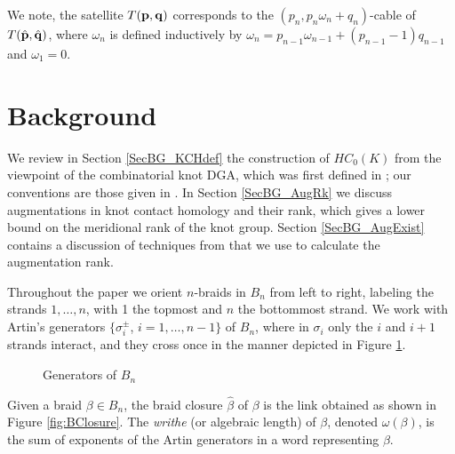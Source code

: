 \documentclass[11pt]{amsart}
\def\s{{\sigma}}
\theoremstyle{definition}
\begin{document}
We note, the satellite $T({\bf p},{\bf q})$ corresponds to the $(p_n,p_n\omega_n+q_n)$-cable of $T(\hat{\bf p},\hat{\bf q})$, where $\omega_n$ is defined inductively by $\omega_n=p_{n-1}\omega_{n-1}+(p_{n-1}-1)q_{n-1}$ and $\omega_1=0$.

\section{Background}
\label{SecBG}

  We review in Section \ref{SecBG_KCHdef} the construction of $HC_0(K)$ from the viewpoint of the combinatorial knot DGA, which was first defined in \cite{Ng08}; our conventions are those given in \cite{Ng12}. In Section \ref{SecBG_AugRk} we discuss augmentations in knot contact homology and their rank, which gives a lower bound on the meridional rank of the knot group. Section \ref{SecBG_AugExist} contains a discussion of techniques from \cite{Cor13a} that we use to calculate the augmentation rank.

  Throughout the paper we orient $n$-braids in $B_n$ from left to right, labeling the strands $1,\ldots, n$, with 1 the topmost and $n$ the bottommost strand. We work with Artin's generators $\{\sigma_i^{\pm}$, $i=1,\ldots,n-1\}$ of $B_n$, where in $\s_i$ only the $i$ and $i+1$ strands interact, and they cross once in the manner depicted in Figure \ref{fig:BraidGens}.
      \begin{figure}[ht]
        \caption{Generators of $B_n$}
        \label{fig:BraidGens}
      \end{figure}
    Given a braid $\beta\in B_n$, the braid closure $\hat{\beta}$ of $\beta$ is the link obtained as shown in Figure \ref{fig:BClosure}. The \emph{writhe} (or algebraic length) of $\beta$, denoted $\omega(\beta)$, is the sum of exponents of the Artin generators in a word representing $\beta$.
\end{document}
